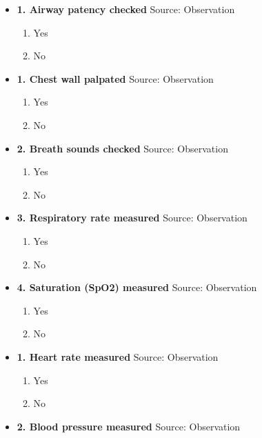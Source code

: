 \documentclass[
]{scrartcl}
\providecommand{\tightlist}{%
  \setlength{\itemsep}{0pt}\setlength{\parskip}{0pt}}\usepackage{longtable,booktabs,array}
\begin{document}
\begin{itemize}
\item
  \textbf{1. Airway patency checked} Source: Observation

  \begin{enumerate}
  \def\labelenumi{\arabic{enumi}.}
  \tightlist
  \item
    Yes
  \item
    No
  \end{enumerate}
\item
  \textbf{1. Chest wall palpated} Source: Observation

  \begin{enumerate}
  \def\labelenumi{\arabic{enumi}.}
  \tightlist
  \item
    Yes
  \item
    No
  \end{enumerate}
\item
  \textbf{2. Breath sounds checked} Source: Observation

  \begin{enumerate}
  \def\labelenumi{\arabic{enumi}.}
  \tightlist
  \item
    Yes
  \item
    No
  \end{enumerate}
\item
  \textbf{3. Respiratory rate measured} Source: Observation

  \begin{enumerate}
  \def\labelenumi{\arabic{enumi}.}
  \tightlist
  \item
    Yes
  \item
    No
  \end{enumerate}
\item
  \textbf{4. Saturation (SpO2) measured} Source: Observation

  \begin{enumerate}
  \def\labelenumi{\arabic{enumi}.}
  \tightlist
  \item
    Yes
  \item
    No
  \end{enumerate}
\item
  \textbf{1. Heart rate measured} Source: Observation

  \begin{enumerate}
  \def\labelenumi{\arabic{enumi}.}
  \tightlist
  \item
    Yes
  \item
    No
  \end{enumerate}
\item
  \textbf{2. Blood pressure measured} Source: Observation


\end{itemize}
\end{document}

